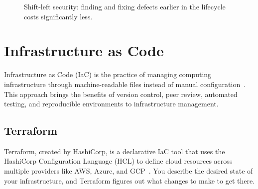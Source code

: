 \begin{figure}[H]
\centering
{}
\caption{Shift-left security: finding and fixing defects earlier in the lifecycle costs significantly less.}
\label{fig:shiftleft}
\end{figure}


\section{Infrastructure as Code}
\label{sec:iac}

Infrastructure as Code (IaC) is the practice of managing computing infrastructure through machine-readable files instead of manual configuration~\cite{morris2020iac}. This approach brings the benefits of version control, peer review, automated testing, and reproducible environments to infrastructure management.

\subsection{Terraform}

Terraform, created by HashiCorp, is a declarative IaC tool that uses the HashiCorp Configuration Language (HCL) to define cloud resources across multiple providers like AWS, Azure, and GCP~\cite{hashicorp2024terraform}. You describe the desired state of your infrastructure, and Terraform figures out what changes to make to get there.

